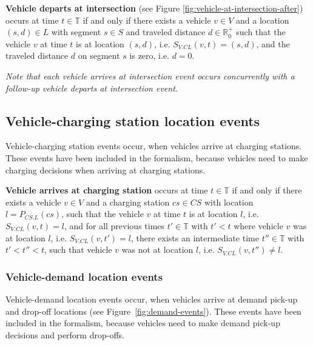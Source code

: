 \documentclass[graybox]{svmult}
\begin{document}
\vspace{2mm}
\noindent \textbf{Vehicle departs at intersection} (see Figure \ref{fig:vehicle-at-intersection-after}) occurs at time $t \in \mathbb{T}$ if and only if there exists a vehicle $v \in V$ and a location $(s,d) \in L$ with segment $s \in S$ and traveled distance $d \in \mathbb{R}_0^+$ such that the vehicle $v$ at time $t$ is at location $(s,d)$, i.e. $S_{V.CL}(v,t) = (s,d)$, and the traveled distance $d$ on segment $s$ is zero, i.e. $d = 0$.

\vspace{2mm}
\noindent \textit{Note that each vehicle arrives at intersection event occurs concurrently with a follow-up vehicle departs at intersection event.}

\subsection{Vehicle-charging station location events}
\label{sec:charging-station-location-events}

Vehicle-charging station events occur, when vehicles arrive at charging stations.
These events have been included in the formalism, because vehicles need to make charging decisions when arriving at charging stations. 

\vspace{2mm}
\noindent \textbf{Vehicle arrives at charging station} occurs at time $t \in \mathbb{T}$ if and only if there exists a vehicle $v \in V$ and a charging station $cs \in CS$ with location $l = P_{CS.L}(cs)$, such that the vehicle $v$ at time $t$ is at location $l$, i.e. $S_{V.CL}(v, t) = l$, and for all previous times $t' \in \mathbb{T}$ with $t' < t$ where vehicle $v$ was at location $l$, i.e. $S_{V.CL}(v, t') = l$, there exists an intermediate time $t'' \in \mathbb{T}$ with $t' < t'' < t$, such that vehicle $v$ was not at location $l$, i.e. $S_{V.CL}(v, t'') \neq l$.

\subsubsection{Vehicle-demand location events}
\label{sec:demand-location-events}

Vehicle-demand location events occur, when vehicles arrive at demand pick-up and drop-off locations (see Figure~\ref{fig:demand-events}).
These events have been included in the formalism, because vehicles need to make demand pick-up decisions and perform drop-offs.
\end{document}
